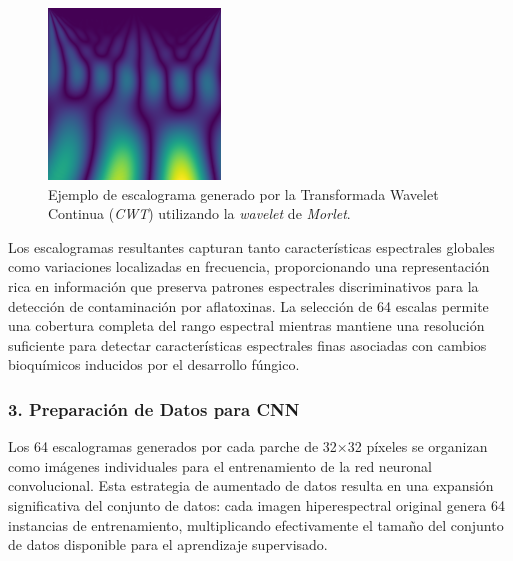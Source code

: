 \begin{figure}[ht]
\centering
\includegraphics[width=\textwidth]{images/CWT_morl_Fx10_20230717_Riego_C0_2023-07-17_09-02-21_ann0_patch_00.png}
\caption{Ejemplo de escalograma generado por la Transformada Wavelet Continua (\emph{CWT}) utilizando la \emph{wavelet} de \emph{Morlet}.}
\label{fig:cwt_morl_example}
\end{figure}

\vspace{5mm}

Los escalogramas resultantes capturan tanto características espectrales globales como variaciones localizadas en frecuencia, proporcionando una representación rica en información que preserva patrones espectrales discriminativos para la detección de contaminación por aflatoxinas. La selección de 64 escalas permite una cobertura completa del rango espectral mientras mantiene una resolución suficiente para detectar características espectrales finas asociadas con cambios bioquímicos inducidos por el desarrollo fúngico.

\subsubsection{3. Preparación de Datos para CNN}

Los 64 escalogramas generados por cada parche de 32×32 píxeles se organizan como imágenes individuales para el entrenamiento de la red neuronal convolucional. Esta estrategia de aumentado de datos resulta en una expansión significativa del conjunto de datos: cada imagen hiperespectral original genera 64 instancias de entrenamiento, multiplicando efectivamente el tamaño del conjunto de datos disponible para el aprendizaje supervisado.

